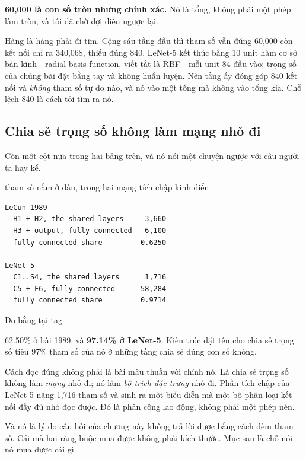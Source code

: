 \textbf{60,000 là con số tròn nhưng chính xác.} Nó là tổng, không phải một phép
làm tròn, và tôi đã chờ đợi điều ngược lại.

Hàng  là hàng phải đi tìm. Cộng sáu tầng đầu thì tham số vẫn đúng
60,000 còn kết nối chỉ ra 340,068, thiếu đúng 840. LeNet-5 kết thúc bằng 10
unit hàm cơ sở bán kính - radial basis function, viết tắt là RBF - mỗi unit 84
đầu vào; trọng số của chúng bài đặt bằng tay và không huấn luyện. Nên tầng ấy đóng góp 840 kết nối và \emph{không} tham số tự do nào,
và nó vào một tổng mà không vào tổng kia. Chỗ lệch 840 là cách tôi tìm ra nó.

\subsection*{Chia sẻ trọng số không làm mạng nhỏ đi}

%
Còn một cột nữa trong hai bảng trên, và nó nói một chuyện ngược với câu người
ta hay kể.

\begin{measured}{tham số nằm ở đâu, trong hai mạng tích chập kinh điển}
\begin{verbatim}
LeCun 1989
  H1 + H2, the shared layers     3,660
  H3 + output, fully connected   6,100
  fully connected share         0.6250

LeNet-5
  C1..S4, the shared layers      1,716
  C5 + F6, fully connected      58,284
  fully connected share         0.9714
\end{verbatim}

Đo bằng  tại tag .
\end{measured}

62.50\% ở bài 1989, và \textbf{97.14\% ở LeNet-5}. Kiến trúc đặt tên cho chia
sẻ trọng số tiêu 97\% tham số của nó ở những tầng chia sẻ đúng con số không.

Cách đọc đúng không phải là bài mâu thuẫn với chính nó. Là chia sẻ trọng số
không làm \emph{mạng} nhỏ đi; nó làm \emph{bộ trích đặc trưng} nhỏ đi. Phần
tích chập của LeNet-5 nặng 1,716 tham số và sinh ra một biểu diễn mà một bộ
phân loại kết nối đầy đủ nhỏ đọc được. Đó là phân công lao động, không phải một
phép nén.

Và nó là lý do câu hỏi của chương này không trả lời được bằng cách đếm tham số.
Cái mà hai ràng buộc mua được không phải kích thước. Mục sau là chỗ nói nó mua
được cái gì.
